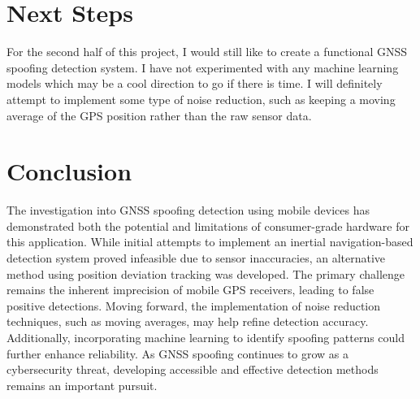 \documentclass[conference]{IEEEtran}
\begin{document}
\section{Next Steps}
For the second half of this project, I would still like to create a functional GNSS spoofing detection system. I have not experimented with any machine learning models which may be a cool direction to go if there is time. I will definitely attempt to implement some type of noise reduction, such as keeping a moving average of the GPS position rather than the raw sensor data.

\section{Conclusion}
The investigation into GNSS spoofing detection using mobile devices has demonstrated both the potential and limitations of consumer-grade hardware for this application. While initial attempts to implement an inertial navigation-based detection system proved infeasible due to sensor inaccuracies, an alternative method using position deviation tracking was developed. The primary challenge remains the inherent imprecision of mobile GPS receivers, leading to false positive detections. Moving forward, the implementation of noise reduction techniques, such as moving averages, may help refine detection accuracy. Additionally, incorporating machine learning to identify spoofing patterns could further enhance reliability. As GNSS spoofing continues to grow as a cybersecurity threat, developing accessible and effective detection methods remains an important pursuit.

\nocite{*}



\balance{}
\end{document}
